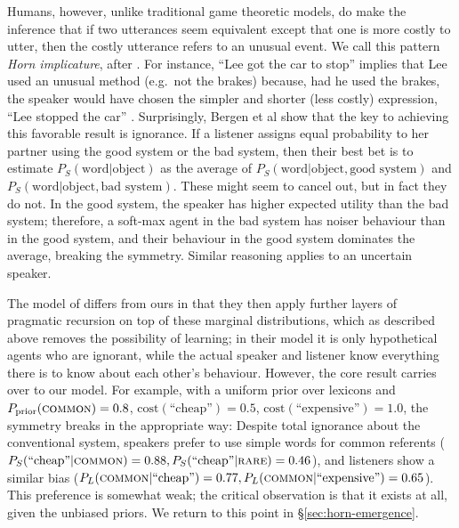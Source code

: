 \documentclass{article} %
\newcommand{\word}{\text{word}}
\newcommand{\obj}{\text{object}}
\begin{document}
Humans, however, unlike traditional game theoretic models, do make the inference that if two utterances seem equivalent except that one is more costly to utter, then the costly utterance refers to an unusual event. We call this pattern \textit{Horn implicature}, after \cite{horn1984}. For instance, ``Lee got the car to stop'' implies that Lee used an unusual method (e.g.~not the brakes) because, had he used the brakes, the speaker would have chosen the simpler and shorter (less costly) expression, ``Lee stopped the car'' \cite{horn1984}. Surprisingly, Bergen et al \cite{bergen2012} show that the key to achieving this favorable result is ignorance. If a listener assigns equal probability to her partner using the good system or the bad system, then their best bet is to estimate $P_S(\word | \obj)$ as the average of $P_S(\word | \obj, \text{good system})$ and $P_S(\word | \obj, \text{bad system})$. These might seem to cancel out, but in fact they do not. In the good system, the speaker has higher expected utility than the bad system; therefore, a soft-max agent in the bad system has noiser behaviour than in the good system, and their behaviour in the good system dominates the average, breaking the symmetry. Similar reasoning applies to an uncertain speaker.


%
%

The model of \cite{bergen2012} differs from ours in that they then apply further layers of pragmatic recursion on top of these marginal distributions, which as described above removes the possibility of learning; in their model it is only hypothetical agents who are ignorant, while the actual speaker and listener know everything there is to know about each other's behaviour. However, the core result carries over to our model. For example, with a uniform prior over lexicons and $P_\text{prior}(\text{\textsc{common}}) = 0.8$, $\text{cost}(\text{``cheap''}) = 0.5$, $\text{cost}(\text{``expensive''}) = 1.0$, the symmetry breaks in the appropriate way: Despite total ignorance about the conventional system, speakers prefer to use simple words for common referents ($P_S(\text{``cheap''} | \text{\textsc{common}}) = 0.88, P_S(\text{``cheap''} | \text{\textsc{rare}}) = 0.46$), and listeners show a similar bias ($P_L(\text{\textsc{common}} | \text{``cheap''}) = 0.77, P_L(\text{\textsc{common}} | \text{``expensive''}) = 0.65$). This preference is somewhat weak; the critical observation is that it exists at all, given the unbiased priors. We return to this point in \S\ref{sec:horn-emergence}.
\end{document}
